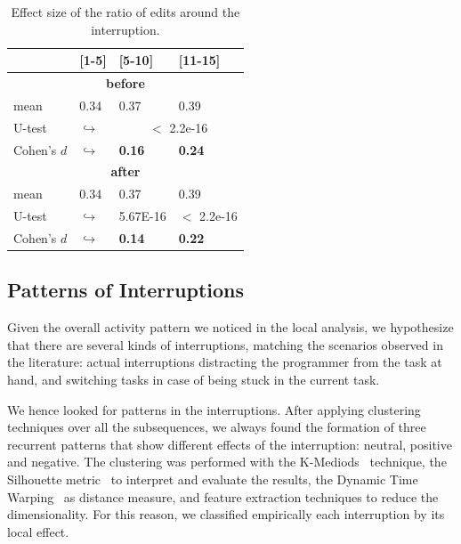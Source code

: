 \documentclass[times]{smrauth}
\begin{document}
\begin{table}[ht!]
\tiny
\renewcommand{\arraystretch}{1.3}
\caption{Effect size of the ratio of edits around the interruption.}
\label{tbl:ratio_all}
\centering
\begin{tabular}{l | p{0.7cm} | p{1.9cm} | p{1.9cm} } 
   & [1-5] & [5-10] & [11-15] \\  
  \hline
  \multicolumn{4}{c}{\textbf{before}} \\
  \hline
  mean & 0.34 &	0.37 &	0.39 \\ 
   \cline{3-4} 
  U-test & $\hookrightarrow$ & \multicolumn{2}{c}{$<$ 2.2e-16}  \\

  \cline{3-4} 
  Cohen's $d$ & $\hookrightarrow$	& \textbf{0.16} & \textbf{0.24}   \\
  \hline
  
  
  \multicolumn{4}{c}{\textbf{after}} \\
  \hline 
  mean & 0.34 &	0.37 &	0.39 \\ 
   \cline{3-4} 
  U-test & $\hookrightarrow$ & 5.67E-16 & $<$ 2.2e-16 \\  
  \cline{3-4} 
  Cohen's $d$ & $\hookrightarrow$	& \textbf{0.14} & \textbf{0.22}  \\  
\end{tabular}
\end{table}

\subsection{Patterns of Interruptions}
Given the overall activity pattern we noticed in the local analysis, we hypothesize that there are several kinds of interruptions, matching the scenarios observed in the literature: actual interruptions distracting the programmer from the task at hand, and switching tasks in case of being stuck in the current task.

We hence looked for patterns in the interruptions.  After applying clustering techniques over all the subsequences, we always found the formation of three recurrent patterns that show different effects of the interruption: neutral, positive and negative. The clustering was performed with the  K-Mediods~\cite{AMP97} technique, the Silhouette metric~\cite{RP87} to interpret and evaluate the results, the Dynamic Time Warping~\cite{KE05} as distance measure, and feature extraction techniques to reduce the dimensionality.  For this reason, we classified empirically each interruption by its local effect. 
\end{document}
